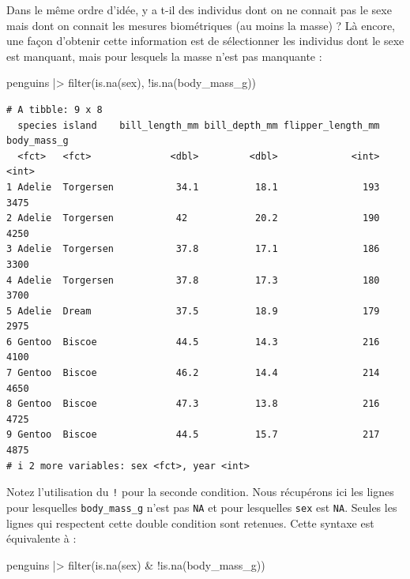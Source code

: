 \documentclass[
  a4paper,
  DIV=11,
  numbers=noendperiod,
  oneside]{scrreprt}
\newenvironment{Shaded}{}{}
\newcommand{\FunctionTok}[1]{\textcolor[rgb]{0.44,0.26,0.76}{#1}}
\newcommand{\NormalTok}[1]{\textcolor[rgb]{0.14,0.16,0.18}{#1}}
\newcommand{\SpecialCharTok}[1]{\textcolor[rgb]{0.00,0.36,0.77}{#1}}
\begin{document}
Dans le même ordre d'idée, y a t-il des individus dont on ne connait pas
le sexe mais dont on connait les mesures biométriques (au moins la
masse) ? Là encore, une façon d'obtenir cette information est de
sélectionner les individus dont le sexe est manquant, mais pour lesquels
la masse n'est pas manquante :

\begin{Shaded}
\begin{Highlighting}[]
\NormalTok{penguins }\SpecialCharTok{|\textgreater{}} 
  \FunctionTok{filter}\NormalTok{(}\FunctionTok{is.na}\NormalTok{(sex),}
         \SpecialCharTok{!}\FunctionTok{is.na}\NormalTok{(body\_mass\_g))}
\end{Highlighting}
\end{Shaded}

\begin{verbatim}
# A tibble: 9 x 8
  species island    bill_length_mm bill_depth_mm flipper_length_mm body_mass_g
  <fct>   <fct>              <dbl>         <dbl>             <int>       <int>
1 Adelie  Torgersen           34.1          18.1               193        3475
2 Adelie  Torgersen           42            20.2               190        4250
3 Adelie  Torgersen           37.8          17.1               186        3300
4 Adelie  Torgersen           37.8          17.3               180        3700
5 Adelie  Dream               37.5          18.9               179        2975
6 Gentoo  Biscoe              44.5          14.3               216        4100
7 Gentoo  Biscoe              46.2          14.4               214        4650
8 Gentoo  Biscoe              47.3          13.8               216        4725
9 Gentoo  Biscoe              44.5          15.7               217        4875
# i 2 more variables: sex <fct>, year <int>
\end{verbatim}

Notez l'utilisation du \texttt{!} pour la seconde condition. Nous
récupérons ici les lignes pour lesquelles \texttt{body\_mass\_g} n'est
pas \texttt{NA} et pour lesquelles \texttt{sex} est \texttt{NA}. Seules
les lignes qui respectent cette double condition sont retenues. Cette
syntaxe est équivalente à :

\begin{Shaded}
\begin{Highlighting}[]
\NormalTok{penguins }\SpecialCharTok{|\textgreater{}} 
  \FunctionTok{filter}\NormalTok{(}\FunctionTok{is.na}\NormalTok{(sex) }\SpecialCharTok{\&} \SpecialCharTok{!}\FunctionTok{is.na}\NormalTok{(body\_mass\_g))}
\end{Highlighting}
\end{Shaded}
\end{document}
